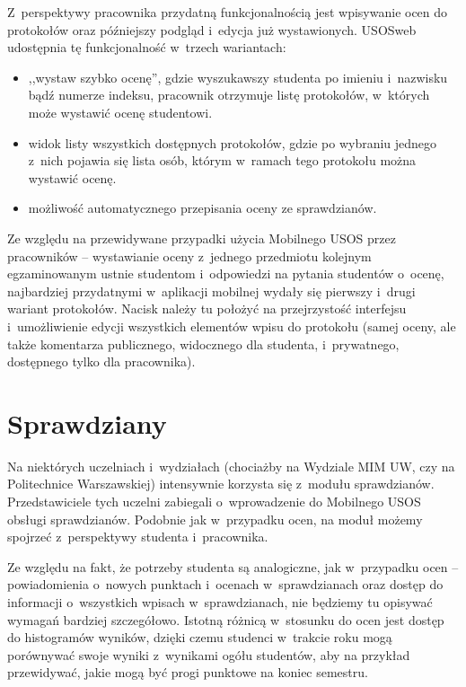 \documentclass{pracamgr}
\begin{document}
Z~perspektywy pracownika przydatną funkcjonalnością jest wpisywanie ocen do protokołów
oraz późniejszy podgląd i~edycja już wystawionych. USOSweb udostępnia tę funkcjonalność
w~trzech wariantach:
\begin{itemize}
	\item ,,wystaw szybko ocenę'', gdzie wyszukawszy studenta po imieniu i~nazwisku bądź
	numerze indeksu, pracownik otrzymuje listę protokołów, w~których może wystawić ocenę
	studentowi.
	\item widok listy wszystkich dostępnych protokołów, gdzie po wybraniu jednego
	z~nich pojawia się lista osób, którym w~ramach tego protokołu można wystawić ocenę.
	\item możliwość automatycznego przepisania oceny ze sprawdzianów.
\end{itemize}

Ze względu na przewidywane przypadki użycia Mobilnego USOS przez pracowników --
wystawianie oceny z~jednego przedmiotu kolejnym egzaminowanym ustnie studentom
i~odpowiedzi na pytania studentów o~ocenę, najbardziej przydatnymi w~aplikacji mobilnej
wydały się pierwszy i~drugi wariant protokołów. Nacisk należy tu położyć na
przejrzystość interfejsu i~umożliwienie edycji wszystkich elementów wpisu do protokołu
(samej oceny, ale także komentarza publicznego, widocznego dla studenta, i~prywatnego,
dostępnego tylko dla pracownika).

\section{Sprawdziany}

Na niektórych uczelniach i~wydziałach (chociażby na Wydziale MIM UW, czy na Politechnice
Warszawskiej) intensywnie korzysta się z~modułu sprawdzianów. Przedstawiciele tych
uczelni zabiegali o~wprowadzenie do Mobilnego USOS obsługi sprawdzianów.
Podobnie jak w~przypadku ocen, na moduł możemy spojrzeć z~perspektywy studenta i~pracownika.

Ze względu na fakt, że potrzeby studenta są analogiczne, jak w~przypadku ocen -- powiadomienia
o~nowych punktach i~ocenach w~sprawdzianach oraz dostęp do informacji o~wszystkich wpisach
w~sprawdzianach, nie będziemy tu opisywać wymagań bardziej szczegółowo. Istotną różnicą
w~stosunku do ocen jest dostęp do histogramów wyników, dzięki czemu studenci w~trakcie
roku mogą porównywać swoje wyniki z~wynikami ogółu studentów, aby na przykład przewidywać, jakie
mogą być progi punktowe na koniec semestru.
\end{document}
